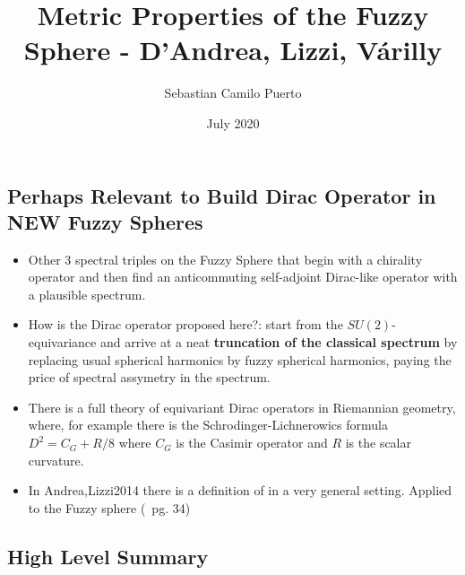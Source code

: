 \documentclass{article}
\title{Metric Properties of the Fuzzy Sphere - D'Andrea, Lizzi, V\'arilly}
\author{Sebastian Camilo Puerto}
\date{July 2020}
\begin{document}
\maketitle

\tableofcontents

\subsection{Perhaps Relevant to Build Dirac Operator in NEW Fuzzy Spheres}

    \begin{itemize}

    \item Other $3$ spectral triples on the Fuzzy Sphere that begin with a chirality operator and then find an anticommuting self-adjoint Dirac-like operator with a plausible spectrum.
    
    \item How is the Dirac operator proposed here?: start from the $SU(2)$-equivariance and arrive at a neat \textbf{truncation of the classical spectrum} by replacing usual spherical harmonics by fuzzy spherical harmonics, paying the price of spectral assymetry in the spectrum.
    
    \item There is a full theory of equivariant Dirac operators in Riemannian geometry, where, for example there is the Schrodinger-Lichnerowics formula $D^2 = C_G + R/8$ where $C_G$ is the Casimir operator and $R$ is the scalar curvature.
    
    \item In Andrea,Lizzi2014 there is a definition of  in a very general setting. Applied to the Fuzzy sphere (~pg. 34) \textbf{}  
    
    \end{itemize}

\subsection{High Level Summary}
\end{document}
